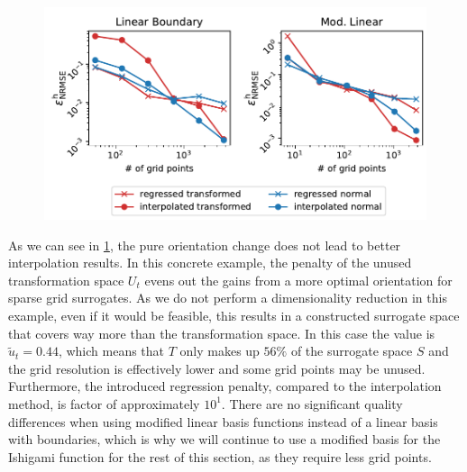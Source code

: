 \documentclass[
  a4paper,  %
  twoside,  %
  bibliography=totoc,
  headsepline,
  cleardoublepage=empty,
  parskip=half,
  draft=false
]{scrbook}
\begin{document}
\newpage
\begin{mdframed}[style=style]
\begin{figure}[H]
\includegraphics[width=\textwidth]{graphics/ishigami_orientation}
\delimit

\label{fig:ishigami_errors}
\end{figure}
\end{mdframed}
%
As we can see in \cref{fig:ishigami_errors}, the pure orientation change does not lead to better interpolation results.
In this concrete example, the penalty of the unused transformation space $U_t$ evens out the gains from a more optimal orientation for sparse grid surrogates.
As we do not perform a dimensionality reduction in this example, even if it would be feasible, this results in a constructed surrogate space that covers way more than the transformation space.
In this case the value is $\tilde{u}_t=0.44$, which means that $T$ only makes up $56\%$ of the surrogate space $S$ and the grid resolution is effectively lower and some grid points may be unused.
Furthermore, the introduced regression penalty, compared to the interpolation method, is factor of approximately $10^1$.
There are no significant quality differences when using modified linear basis functions instead of a linear basis with boundaries, which is why we will continue to use a modified basis for the Ishigami function for the rest of this section, as they require less grid points.
\end{document}
